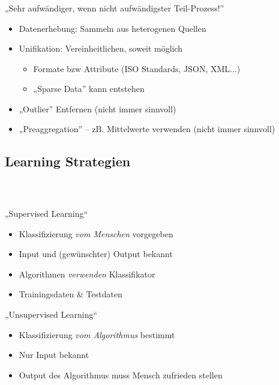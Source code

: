 \begin{frame}
    \frametitle{\insertsubsection}
    „Sehr aufwändiger, wenn nicht aufwändigster Teil-Prozess!” \cite{pocket2014}
    \vspace{1em}
    \begin{itemize}
        \setlength\itemsep{1em}
        \item Datenerhebung: Sammeln aus heterogenen Quellen
        \item Unifikation: Vereinheitlichen, soweit möglich
            \begin{itemize}
                \setlength\itemsep{0.5em}
                \item Formate bzw Attribute (ISO Standards, JSON, XML...)
                \item „Sparse Data” kann entstehen
            \end{itemize}
        \item „Outlier” Entfernen (nicht immer sinnvoll)
        \item „Preaggregation” -- zB. Mittelwerte verwenden (nicht immer sinnvoll)
    \end{itemize}
\end{frame}

\subsection{Learning Strategien}

\begin{frame}
    \frametitle{\insertsubsection \ \cite{datamining2011}}
    \begin{block}{„Supervised Learning“}
        \vspace{0.5em}
        \begin{itemize}
            \setlength\itemsep{0.5em}
            \item Klassifizierung \emph{vom Menschen} vorgegeben
            \item Input und (gewünschter) Output bekannt
            \item Algorithmen \emph{verwenden} Klassifikator
            \item Trainingsdaten \& Testdaten
        \end{itemize}
    \end{block}
    \vspace{0.8em}
    \begin{block}{„Unsupervised Learning“}
        \vspace{0.5em}
        \begin{itemize}
            \setlength\itemsep{0.5em}
            \item Klassifizierung \emph{vom Algorithmus} bestimmt
            \item Nur Input bekannt
            \item Output des Algorithmus muss Mensch zufrieden stellen
        \end{itemize}
    \end{block}
\end{frame}

